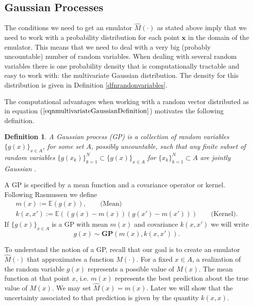 \documentclass[12pt]{book}
\newtheorem{definition}{Definition}
\newcommand{\E}{\mathbb{E}} %
\begin{document}
\subsection{Gaussian Processes}
The conditions we need to get an emulator $\hat{M}(\cdot)$ as stated above imply that we need
to work with a probability distribution for each point $\textbf{x}$ in the domain of the emulator.
This means that  we need
to deal with a very big (probably uncountable) number of random variables. When dealing with 
several random variables there is one probability density that is computationally tractable and
easy to work with: the multivariate Gaussian distribution. The density for this distribution
is given in Definition \ref{dfnrandonvariables}. 


The computational advantages
when working with a random vector distributed as in  
equation ($\ref{eqnmultivariateGaussianDefinition}$) motivates the following definition.

\begin{definition}\label{dfnGP}
A Gaussian process (GP) is a collection of random variables $\{g(x)\}_{x\in A}$, for some set $A$, 
possibly uncountable,
 such that any finite subset of random variables
 $\{g(x_{k})\}_{k=1}^{N}\subset\{g(x)\}_{x\in A}$ for 
$\{x_{k}\}_{k=1}^{N}\subset A$ are jointly Gaussian
\cite{rasmussen2006gaussian}. 
\end{definition}

A GP is specified by a mean function and a covariance operator or kernel. 
Following  Rasmussen \cite{rasmussen2006gaussian} we define
\begin{eqnarray*}
m(x):=\E(g(x)),\qquad\text{(Mean)}\\
k(x,x'):=\E((g(x)-m(x))(g(x')-m(x')))\qquad\text{(Kernel)}.
\end{eqnarray*}
If $\{g(x)\}_{x\in A}$ is a GP with mean $m(x)$ and covariance $k(x,x')$ we will write
\begin{equation*}
g(x)\sim \textbf{GP}(m(x),k(x,x')).
\end{equation*} 

To understand the notion of a GP, recall that our goal is to create
an emulator $\hat{M}(\cdot)$ that approximates a function $M(\cdot)$. 
For a fixed $x\in A$, a realization of the  random variable $g(x)$ represents
a possible value of $M(x)$. The mean function at that point $x$, i.e. $m(x)$ 
represents the best prediction about the true value of $M(x)$. We may set
$\hat{M}(x)=m(x)$. Later we will show that the uncertainty 
associated to that prediction is given by the quantity $k(x,x)$.
\end{document}
